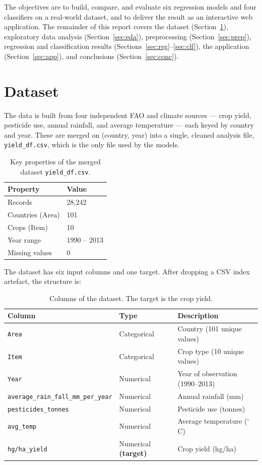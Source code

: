 \documentclass[11pt,a4paper]{article}
\begin{document}
The objectives are to build, compare, and evaluate six regression models and
four classifiers on a real-world dataset, and to deliver the result as an
interactive web application. The remainder of this report covers the dataset
(Section~\ref{sec:data}), exploratory data analysis (Section~\ref{sec:eda}),
preprocessing (Section~\ref{sec:prep}), regression and classification results
(Sections~\ref{sec:reg}--\ref{sec:clf}), the application
(Section~\ref{sec:app}), and conclusions (Section~\ref{sec:conc}).

\section{Dataset}\label{sec:data}

The data is built from four independent FAO and climate sources --- crop yield,
pesticide use, annual rainfall, and average temperature --- each keyed by
country and year. These are merged on (country, year) into a single, cleaned
analysis file, \texttt{yield\_df.csv}, which is the only file used by the models.

\begin{table}[H]
\centering
\caption{Key properties of the merged dataset \texttt{yield\_df.csv}.}
\begin{tabular}{ll}
\toprule
\textbf{Property} & \textbf{Value} \\
\midrule
Records          & 28{,}242 \\
Countries (Area) & 101 \\
Crops (Item)     & 10 \\
Year range       & 1990 -- 2013 \\
Missing values   & 0 \\
\bottomrule
\end{tabular}
\end{table}

The dataset has six input columns and one target. After dropping a CSV index
artefact, the structure is:

\begin{table}[H]
\centering
\caption{Columns of the dataset. The target is the crop yield.}
\begin{tabular}{lll}
\toprule
\textbf{Column} & \textbf{Type} & \textbf{Description} \\
\midrule
\texttt{Area}  & Categorical & Country (101 unique values) \\
\texttt{Item}  & Categorical & Crop type (10 unique values) \\
\texttt{Year}  & Numerical   & Year of observation (1990--2013) \\
\texttt{average\_rain\_fall\_mm\_per\_year} & Numerical & Annual rainfall (mm) \\
\texttt{pesticides\_tonnes} & Numerical & Pesticide use (tonnes) \\
\texttt{avg\_temp} & Numerical & Average temperature ($^\circ$C) \\
\texttt{hg/ha\_yield} & Numerical \textbf{(target)} & Crop yield (hg/ha) \\
\bottomrule
\end{tabular}
\end{table}
\end{document}
